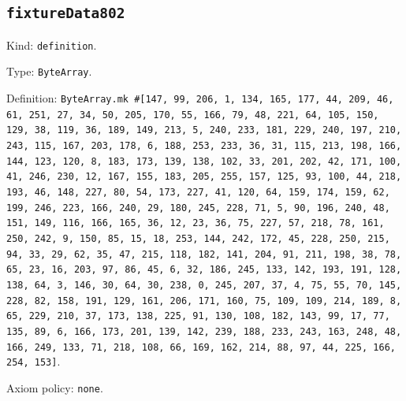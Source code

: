 \documentclass[11pt]{article}
\begin{document}
\subsection*{\texttt{fixtureData802}}
\noindent Kind: \texttt{definition}.\par
\noindent Type: \texttt{ByteArray}.\par
\noindent Definition: \texttt{ByteArray.mk \#[147, 99, 206, 1, 134, 165, 177, 44, 209, 46, 61, 251, 27, 34, 50, 205, 170, 55, 166, 79, 48, 221, 64, 105, 150, 129, 38, 119, 36, 189, 149, 213, 5, 240, 233, 181, 229, 240, 197, 210, 243, 115, 167, 203, 178, 6, 188, 253, 233, 36, 31, 115, 213, 198, 166, 144, 123, 120, 8, 183, 173, 139, 138, 102, 33, 201, 202, 42, 171, 100, 41, 246, 230, 12, 167, 155, 183, 205, 255, 157, 125, 93, 100, 44, 218, 193, 46, 148, 227, 80, 54, 173, 227, 41, 120, 64, 159, 174, 159, 62, 199, 246, 223, 166, 240, 29, 180, 245, 228, 71, 5, 90, 196, 240, 48, 151, 149, 116, 166, 165, 36, 12, 23, 36, 75, 227, 57, 218, 78, 161, 250, 242, 9, 150, 85, 15, 18, 253, 144, 242, 172, 45, 228, 250, 215, 94, 33, 29, 62, 35, 47, 215, 118, 182, 141, 204, 91, 211, 198, 38, 78, 65, 23, 16, 203, 97, 86, 45, 6, 32, 186, 245, 133, 142, 193, 191, 128, 138, 64, 3, 146, 30, 64, 30, 238, 0, 245, 207, 37, 4, 75, 55, 70, 145, 228, 82, 158, 191, 129, 161, 206, 171, 160, 75, 109, 109, 214, 189, 8, 65, 229, 210, 37, 173, 138, 225, 91, 130, 108, 182, 143, 99, 17, 77, 135, 89, 6, 166, 173, 201, 139, 142, 239, 188, 233, 243, 163, 248, 48, 166, 249, 133, 71, 218, 108, 66, 169, 162, 214, 88, 97, 44, 225, 166, 254, 153]}.\par
\noindent Axiom policy: \texttt{none}.\par
\end{document}
